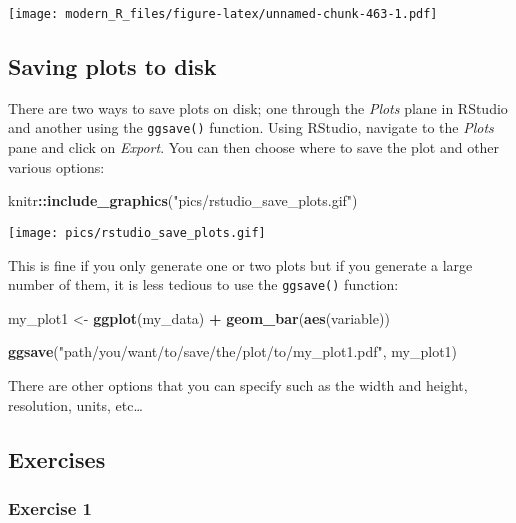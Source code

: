 \documentclass[
]{article}
\newenvironment{Shaded}{\begin{snugshade}}{\end{snugshade}}
\newcommand{\KeywordTok}[1]{\textcolor[rgb]{0.13,0.29,0.53}{\textbf{#1}}}
\newcommand{\NormalTok}[1]{#1}
\newcommand{\OperatorTok}[1]{\textcolor[rgb]{0.81,0.36,0.00}{\textbf{#1}}}
\newcommand{\StringTok}[1]{\textcolor[rgb]{0.31,0.60,0.02}{#1}}
\begin{document}
\texttt{[image: modern\_R\_files/figure-latex/unnamed-chunk-463-1.pdf]}

\hypertarget{saving-plots-to-disk}{%
\subsection{Saving plots to disk}\label{saving-plots-to-disk}}

There are two ways to save plots on disk; one through the \emph{Plots} plane in RStudio and another using the
\texttt{ggsave()} function. Using RStudio, navigate to the \emph{Plots} pane and click on \emph{Export}. You can
then choose where to save the plot and other various options:

\begin{Shaded}
\begin{Highlighting}[]
\NormalTok{knitr}\OperatorTok{::}\KeywordTok{include\_graphics}\NormalTok{(}\StringTok{"pics/rstudio\_save\_plots.gif"}\NormalTok{)}
\end{Highlighting}
\end{Shaded}

\texttt{[image: pics/rstudio\_save\_plots.gif]}

This is fine if you only generate one or two plots but if you generate a large number of them, it
is less tedious to use the \texttt{ggsave()} function:

\begin{Shaded}
\begin{Highlighting}[]
\NormalTok{my\_plot1 \textless{}{-}}\StringTok{ }\KeywordTok{ggplot}\NormalTok{(my\_data) }\OperatorTok{+}
\StringTok{  }\KeywordTok{geom\_bar}\NormalTok{(}\KeywordTok{aes}\NormalTok{(variable))}

\KeywordTok{ggsave}\NormalTok{(}\StringTok{"path/you/want/to/save/the/plot/to/my\_plot1.pdf"}\NormalTok{, my\_plot1)}
\end{Highlighting}
\end{Shaded}

There are other options that you can specify such as the width and height, resolution, units,
etc\ldots{}

\hypertarget{exercises-3}{%
\subsection{Exercises}\label{exercises-3}}

\hypertarget{exercise-1-3}{%
\subsubsection*{Exercise 1}\label{exercise-1-3}}
\end{document}
